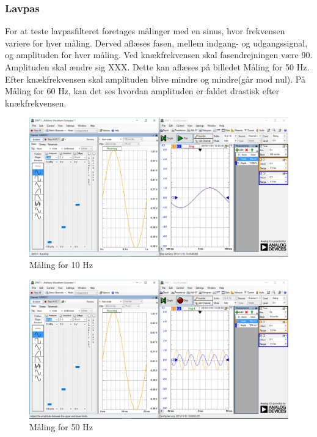 \subsubsection{Lavpas}
For at teste lavpasfilteret foretages målinger med en sinus, hvor frekvensen variere for hver måling. Derved aflæses fasen, mellem indgang- og udgangssignal, og amplituden for hver måling. 
Ved knækfrekvensen skal fasendrejningen være 90\textdegree. Amplituden skal ændre sig XXX. Dette kan aflæses på billedet Måling for 50 Hz.
Efter knækfrekvensen skal amplituden blive mindre og mindre(går mod nul). På Måling for 60 Hz, kan det ses hvordan amplituden er faldet drastisk efter knækfrekvensen.  \\
\begin{figure}[H]
	\centering
	\includegraphics[width=1.0\textwidth]{Figurer/10Hz}
	\caption{Måling for 10 Hz}
	\label{fig:maeling10Hz}
\end{figure}

\begin{figure}[H]
	\centering
	\includegraphics[width=1.0\textwidth]{Figurer/50Hz}
	\caption{Måling for 50 Hz}
	\label{fig:maeling50Hz}
\end{figure}

